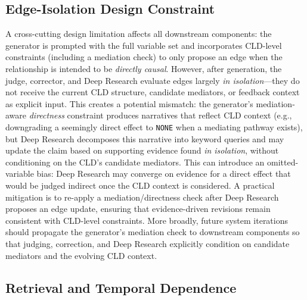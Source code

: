 \subsection{Edge-Isolation Design Constraint}

A cross-cutting design limitation affects all downstream components: the generator is prompted with the full variable set and incorporates CLD-level constraints (including a mediation check) to only propose an edge when the relationship is intended to be \textit{directly causal}. However, after generation, the judge, corrector, and Deep Research evaluate edges largely \textit{in isolation}---they do not receive the current CLD structure, candidate mediators, or feedback context as explicit input. This creates a potential mismatch: the generator's mediation-aware \emph{directness} constraint produces narratives that reflect CLD context (e.g., downgrading a seemingly direct effect to \texttt{NONE} when a mediating pathway exists), but Deep Research decomposes this narrative into keyword queries and may update the claim based on supporting evidence found \emph{in isolation}, without conditioning on the CLD's candidate mediators. This can introduce an omitted-variable bias: Deep Research may converge on evidence for a direct effect that would be judged indirect once the CLD context is considered. A practical mitigation is to re-apply a mediation/directness check after Deep Research proposes an edge update, ensuring that evidence-driven revisions remain consistent with CLD-level constraints. More broadly, future system iterations should propagate the generator's mediation check to downstream components so that judging, correction, and Deep Research explicitly condition on candidate mediators and the evolving CLD context.

\subsection{Retrieval and Temporal Dependence}

